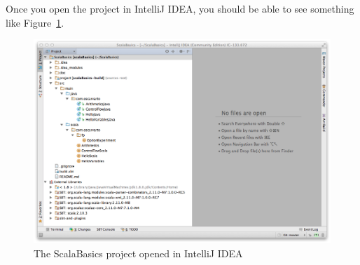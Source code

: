 \documentclass[fontsize=12pt, parskipp=full, paper=legal]{scrbook}
\begin{document}
Once you open the project in IntelliJ IDEA, you should be able to see
something like Figure~\ref{fig:scalaBasics-IntelliJ}.

\begin{figure}[h!]
  \centering
  \includegraphics[scale=0.5]{figures/scalaBasicsIntelliJ.png}
  \caption{The ScalaBasics project opened in IntelliJ IDEA}
  \label{fig:scalaBasics-IntelliJ}
\end{figure}
\end{document}
